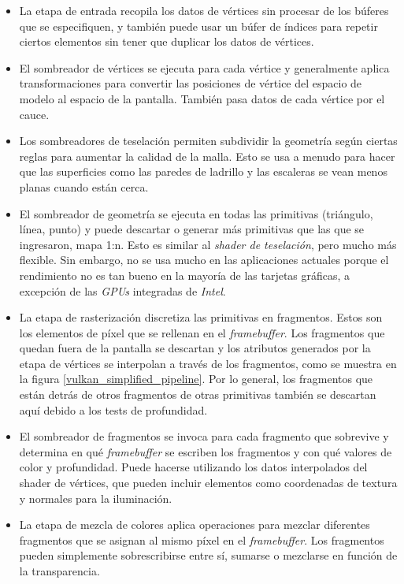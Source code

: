 \documentclass[a4paper]{book}
\begin{document}
\begin{itemize}
  \item La etapa de entrada recopila los datos de vértices sin procesar de los búferes que
  se especifiquen, y también puede usar un búfer de índices para repetir ciertos elementos sin tener
  que duplicar los datos de vértices.

  \item El sombreador de vértices se ejecuta para cada vértice y generalmente aplica transformaciones
  para convertir las posiciones de vértice del espacio de modelo al espacio de la pantalla. También pasa
  datos de cada vértice por el cauce.

  \item Los sombreadores de teselación permiten subdividir la geometría según ciertas reglas para aumentar
  la calidad de la malla. Esto se usa a menudo para hacer que las superficies como las paredes de ladrillo
  y las escaleras se vean menos planas cuando están cerca.

  \item El sombreador de geometría se ejecuta en todas las primitivas (triángulo, línea, punto) y puede
  descartar o generar más primitivas que las que se ingresaron, mapa 1:n. Esto es similar al \textit{shader de teselación},
  pero mucho más flexible. Sin embargo, no se usa mucho en las aplicaciones actuales porque el rendimiento no es
  tan bueno en la mayoría de las tarjetas gráficas, a excepción de las \textit{GPUs} integradas de \textit{Intel}.

  \item La etapa de rasterización discretiza las primitivas en fragmentos. Estos son los elementos de píxel
  que se rellenan en el \textit{framebuffer}. Los fragmentos que quedan fuera de la pantalla se descartan y los atributos
  generados por la etapa de vértices se interpolan a través de los fragmentos, como se muestra en la figura \ref{vulkan_simplified_pipeline}.
  Por lo general, los fragmentos que están detrás de otros fragmentos de otras primitivas también se descartan
  aquí debido a los tests de profundidad.

  \item El sombreador de fragmentos se invoca para cada fragmento que sobrevive y determina en qué \textit{framebuffer}
  se escriben los fragmentos y con qué valores de color y profundidad. Puede hacerse utilizando los datos interpolados
  del shader de vértices, que pueden incluir elementos como coordenadas de textura y normales para la iluminación.

  \item La etapa de mezcla de colores aplica operaciones para mezclar diferentes fragmentos que se asignan al mismo píxel
  en el \textit{framebuffer}. Los fragmentos pueden simplemente sobrescribirse entre sí, sumarse o mezclarse en función de la transparencia.

\end{itemize}
\end{document}

